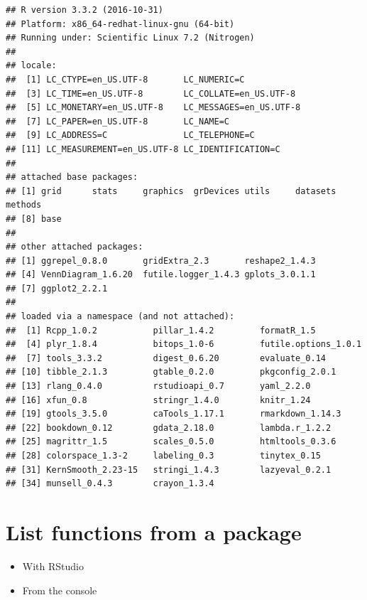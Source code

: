 \documentclass[]{book}
\providecommand{\tightlist}{%
  \setlength{\itemsep}{0pt}\setlength{\parskip}{0pt}}
\begin{document}
\begin{verbatim}
## R version 3.3.2 (2016-10-31)
## Platform: x86_64-redhat-linux-gnu (64-bit)
## Running under: Scientific Linux 7.2 (Nitrogen)
## 
## locale:
##  [1] LC_CTYPE=en_US.UTF-8       LC_NUMERIC=C              
##  [3] LC_TIME=en_US.UTF-8        LC_COLLATE=en_US.UTF-8    
##  [5] LC_MONETARY=en_US.UTF-8    LC_MESSAGES=en_US.UTF-8   
##  [7] LC_PAPER=en_US.UTF-8       LC_NAME=C                 
##  [9] LC_ADDRESS=C               LC_TELEPHONE=C            
## [11] LC_MEASUREMENT=en_US.UTF-8 LC_IDENTIFICATION=C       
## 
## attached base packages:
## [1] grid      stats     graphics  grDevices utils     datasets  methods  
## [8] base     
## 
## other attached packages:
## [1] ggrepel_0.8.0       gridExtra_2.3       reshape2_1.4.3     
## [4] VennDiagram_1.6.20  futile.logger_1.4.3 gplots_3.0.1.1     
## [7] ggplot2_2.2.1      
## 
## loaded via a namespace (and not attached):
##  [1] Rcpp_1.0.2           pillar_1.4.2         formatR_1.5         
##  [4] plyr_1.8.4           bitops_1.0-6         futile.options_1.0.1
##  [7] tools_3.3.2          digest_0.6.20        evaluate_0.14       
## [10] tibble_2.1.3         gtable_0.2.0         pkgconfig_2.0.1     
## [13] rlang_0.4.0          rstudioapi_0.7       yaml_2.2.0          
## [16] xfun_0.8             stringr_1.4.0        knitr_1.24          
## [19] gtools_3.5.0         caTools_1.17.1       rmarkdown_1.14.3    
## [22] bookdown_0.12        gdata_2.18.0         lambda.r_1.2.2      
## [25] magrittr_1.5         scales_0.5.0         htmltools_0.3.6     
## [28] colorspace_1.3-2     labeling_0.3         tinytex_0.15        
## [31] KernSmooth_2.23-15   stringi_1.4.3        lazyeval_0.2.1      
## [34] munsell_0.4.3        crayon_1.3.4
\end{verbatim}

\hypertarget{list-functions-from-a-package}{%
\section{List functions from a package}\label{list-functions-from-a-package}}

\begin{itemize}
\tightlist
\item
  With RStudio 
\end{itemize}

\begin{itemize}
\tightlist
\item
  From the console
\end{itemize}
\end{document}
